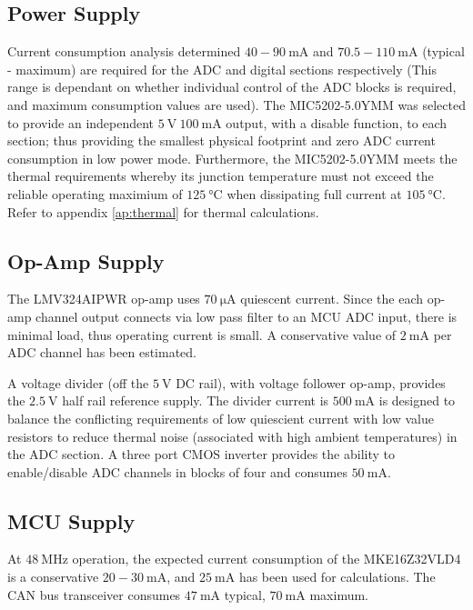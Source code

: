 \subsection{Power Supply}
Current consumption analysis determined $40 - \SI{90}{\milli\ampere}$ and $70.5 - \SI{110}{\milli\ampere}$ (typical - maximum) are required for the ADC and digital sections respectively
(This range is dependant on whether individual control of the ADC blocks is required, and maximum consumption values are used).
The MIC5202-5.0YMM was selected to provide an independent $\SI{5}{\volt}\ \SI{100}{\milli\ampere}$ output, with a disable function, to each section; thus providing the smallest physical footprint and zero ADC current consumption in low power mode.
Furthermore, the MIC5202-5.0YMM meets the thermal requirements whereby its junction temperature must not exceed the reliable operating maximium of $\SI{125}{\degreeCelsius}$ when dissipating full current at $\SI{105}{\degreeCelsius}$.
Refer to appendix \ref{ap:thermal} for thermal calculations.
 
\subsection{Op-Amp Supply}
The LMV324AIPWR op-amp uses $\SI{70}{\micro\ampere}$ quiescent current.
Since the each op-amp channel output connects via low pass filter to an MCU ADC input, there is minimal load, thus operating current is small.
A conservative value of $\SI{2}{\milli\ampere}$ per ADC channel has been estimated.

A voltage divider (off the $\SI{5}{\volt}$ DC rail), with voltage follower op-amp, provides the $\SI{2.5}{\volt}$ half rail reference supply.
The divider current is $\SI{500}{\milli\ampere}$ is designed to balance the conflicting requirements of low quiescient current with low value resistors to reduce thermal noise (associated with high ambient temperatures) in the ADC section.
A three port CMOS inverter provides the ability to enable/disable ADC channels in blocks of four and consumes $\SI{50}{\milli\ampere}$.

\subsection{MCU Supply}
At $\SI{48}{\mega\hertz}$ operation, the expected current consumption of the MKE16Z32VLD4 is a conservative $20 - \SI{30}{\milli\ampere}$, and $\SI{25}{\milli\ampere}$ has been used for calculations.
The CAN bus transceiver consumes $\SI{47}{\milli\ampere}$ typical, $\SI{70}{\milli\ampere}$ maximum.

